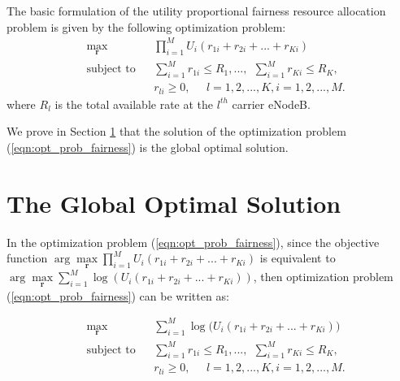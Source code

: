 \documentclass[conference]{IEEEtran}
\begin{document}
The basic formulation of the utility proportional fairness resource allocation problem is given by the following optimization problem:
\begin{equation}\label{eqn:opt_prob_fairness}
\begin{aligned}
& \underset{\textbf{r}}{\text{max}} & & \prod_{i=1}^{M}U_i(r_{1i} + r_{2i} + ... + r_{Ki}) \\
& \text{subject to} & & \sum_{i=1}^{M}r_{1i} \leq R_1, ..., \:\:\sum_{i=1}^{M}r_{Ki} \leq R_K,\\
& & & r_{li} \geq 0, \;\;\;\;\;l = 1,2, ...,K, i = 1,2, ...,M.
\end{aligned}
\end{equation}
where $R_l$ is the total available rate at the $l^{th}$ carrier eNodeB.

We prove in Section \ref{sec:Proof} that the solution of the optimization problem (\ref{eqn:opt_prob_fairness}) is the global optimal solution. 
\section{The Global Optimal Solution}\label{sec:Proof}

In the optimization problem (\ref{eqn:opt_prob_fairness}), since the objective function $\arg \underset{\textbf{r}} \max \prod_{i=1}^{M}U_i(r_{1i}+r_{2i}+ ...+r_{Ki})$ is equivalent to $\arg \underset{\textbf{r}} \max \sum_{i=1}^{M}\log(U_i(r_{1i}+r_{2i}+ ...+r_{Ki}))$, then optimization problem (\ref{eqn:opt_prob_fairness}) can be written as:

\begin{equation}\label{eqn:opt_prob_fairness_mod}
\begin{aligned}
& \underset{\textbf{r}}{\text{max}} & & \sum_{i=1}^{M}\log \Big(U_i(r_{1i} + r_{2i} + ... + r_{Ki})\Big) \\
& \text{subject to} & & \sum_{i=1}^{M}r_{1i} \leq R_1,  ..., \:\:\sum_{i=1}^{M}r_{Ki} \leq R_K,\\
& & & r_{li} \geq 0, \;\;\;\;\;l = 1,2, ...,K, i = 1,2, ...,M.
\end{aligned}
\end{equation}
\end{document}
